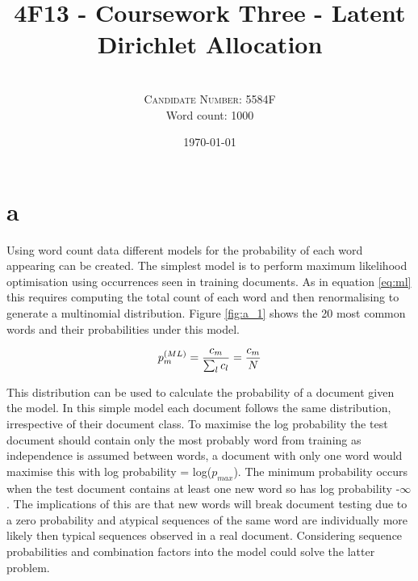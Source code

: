 \documentclass[twoside,twocolumn]{article}
\title{4F13 - Coursework Three - Latent Dirichlet Allocation } %
\author{%
\\
\textsc{Candidate Number: 5584F} \\
\normalsize Word count: 1000 \\
}
\date{\today} %
\begin{document}
\onecolumn

\twocolumn
\maketitle




\section{a}
Using word count data different models for the probability of each word appearing can be created. The simplest model is to perform maximum likelihood optimisation using occurrences seen in training documents. As in equation \ref{eq:ml} this requires computing the total count of each word and then renormalising to generate a multinomial distribution. Figure \ref{fig:a_1} shows the 20 most common words and their probabilities under this model. 

\begin{equation}
p_m^{(ML)} = \frac{c_m}{\sum_lc_l}= \frac{c_m}{N}\\
\label{eq:ml}
\end{equation}

This distribution can be used to calculate the probability of a document given the model. In this simple model each document follows the same distribution, irrespective of their document class. To maximise the log probability the test document should contain only the most probably word from training as independence is assumed between words, a document with only one word would maximise this with log probability = log($p_{max}$). The minimum probability occurs when the test document contains at least one new word so has log probability -$\infty$. The implications of this are that new words will break document testing due to a zero probability and atypical sequences of the same word are individually more likely then typical sequences observed in a real document. Considering sequence probabilities and combination factors into the model could solve the latter problem.
\end{document}
